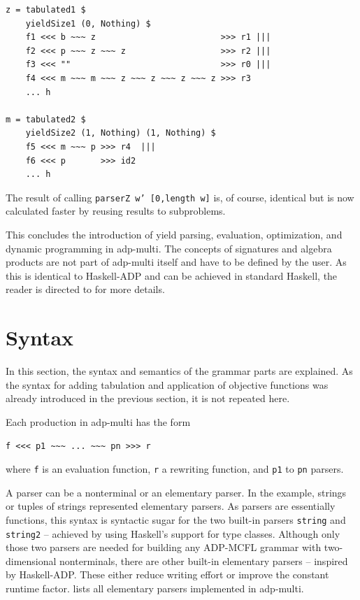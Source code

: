 \documentclass[
    a4paper,
    12pt,
    twoside,
    BCOR=12mm,
    parskip=half,
    chapterprefix,
    numbers=noenddot,
    bibliography=totoc
]{scrbook}
\begin{document}
\begin{lstlisting}[caption=Application of wrapper functions for memoization]
z = tabulated1 $
    yieldSize1 (0, Nothing) $
    f1 <<< b ~~~ z                         >>> r1 |||
    f2 <<< p ~~~ z ~~~ z                   >>> r2 |||
    f3 <<< ""                              >>> r0 |||
    f4 <<< m ~~~ m ~~~ z ~~~ z ~~~ z ~~~ z >>> r3
    ... h
		
m = tabulated2 $
    yieldSize2 (1, Nothing) (1, Nothing) $
    f5 <<< m ~~~ p >>> r4  |||
    f6 <<< p       >>> id2
    ... h
\end{lstlisting}

The result of calling \texttt{parserZ w' [0,length w]} is, of course, identical but is now calculated faster by reusing results to subproblems. 

This concludes the introduction of yield parsing, evaluation, optimization, and dynamic programming in adp-multi. The concepts of signatures and algebra products are not part of adp-multi itself and have to be defined by the user. As this is identical to Haskell-ADP and can be achieved in standard Haskell, the reader is directed to \citet{giegerich_discipline_2004,sauthoff_bellmans_2011-1} for more details.

\section{Syntax}
\label{sec:adpmulti_syntax}

In this section, the syntax and semantics of the grammar parts are explained. As the syntax for adding tabulation and application of objective functions was already introduced in the previous section, it is not repeated here.

Each production in adp-multi has the form
\begin{center}
	\verb|f <<< p1 ~~~ ... ~~~ pn >>> r|
\end{center}
where \verb|f| is an evaluation function, \verb|r| a rewriting function, and \verb|p1| to \verb|pn| parsers.

A parser can be a nonterminal or an elementary parser. In the example, strings or tuples of strings represented elementary parsers. As parsers are essentially functions, this syntax is syntactic sugar for the two built-in parsers \verb|string| and \verb|string2| -- achieved by using Haskell's support for type classes. Although only those two parsers are needed for building any ADP-MCFL grammar with two-dimensional nonterminals, there are other built-in elementary parsers -- inspired by Haskell-ADP. These either reduce writing effort or improve the constant runtime factor.  lists all elementary parsers implemented in adp-multi. 
\end{document}
